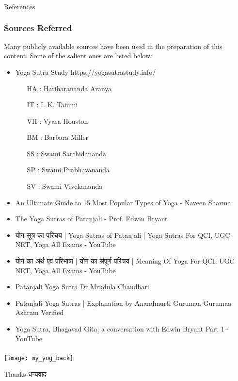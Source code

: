 \begin{frame}[fragile]\frametitle{}
\begin{center}
{\Large References}
\end{center}
\end{frame}


\begin{frame}[fragile]\frametitle{Sources Referred}

Many publicly available sources have been used in the preparation of this content. Some of the salient ones are listed below:

	\begin{itemize}
	\item Yoga Sutra Study https://yogasutrastudy.info/
		\begin{itemize}
		\item [HA]: Hariharananda Aranya
		\item [IT]: I. K. Taimni
		\item [VH]: Vyasa Houston
		\item [BM]: Barbara Miller
		\item [SS]: Swami Satchidananda
		\item [SP]: Swami Prabhavananda
		\item [SV]: Swami Vivekananda
		\end{itemize}	
	\item An Ultimate Guide to 15 Most Popular Types of Yoga - Naveen Sharma
	\item The Yoga Sutras of Patanjali - Prof. Edwin Bryant
	\item योग सूत्र का परिचय | Yoga Sutras of Patanjali | Yoga Sutras For QCI, UGC NET, Yoga All Exams - YouTube
	\item योग का अर्थ एवं परिभाषा | योग का संपूर्ण परिचय | Meaning Of Yoga For QCI, UGC NET, Yoga All Exams - YouTube
	\item Patanjali Yoga Sutra Dr Mrudula Chaudhari
	\item Patanjali Yoga Sutras | Explanation by Anandmurti Gurumaa Gurumaa Ashram Verified
	\item Yoga Sutra, Bhagavad Gita; a conversation with Edwin Bryant Part 1 - YouTube
	\end{itemize}

\end{frame}


\begin{frame}[fragile]\frametitle{}

\begin{center}
\texttt{[image: my\_yog\_back]}

Thanks धन्यवाद
\end{center}

\end{frame}